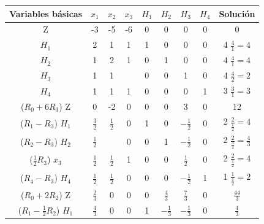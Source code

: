 \documentclass[fleqn, 12pt]{article}
\begin{document}
\begin{enumerate}
		\begin{center}
			\begin{tabular}{|c|c|c|c|c|c|c|c|c|}
				\hline
				Variables básicas & $ x_1 $ & $ x_2 $ & $ x_3 $  & $ H_1 $ & $ H_2 $ & $ H_3 $ & $ H_4 $ & Solución \\
				\hline
				Z                 & -3      & -5      & -6       & 0       & 0       & 0       & 0       & 0 \\
				\hline
				$ H_1 $           & 2       & 1       & 1        & 1       & 0       & 0       & 0       & 4 \; $ \frac{4}{1} = 4 $ \\
				\hline
				$ H_2 $           & 1       & 2       & 1        & 0       & 1       & 0       & 0       & 4 \; $ \frac{4}{1} = 4 $ \\
				\hline
				$ H_3 $           & 1       & 1       & \fbox{2} & 0       & 0       & 1       & 0       & 4 \; $ \frac{4}{2} = 2 $ \\
				\hline
				$ H_4 $           & 1       & 1       & 1        & 0       & 0       & 0       & 1       & 3 \; $ \frac{3}{1} = 3 $ \\
				\hline\hline
				($R_0 + 6 R_3$) Z & 0       & -2      & 0        & 0       & 0       & 3       & 0       & 12 \\
				\hline
				($R_1 - R_3$) $ H_1 $ & $ \frac{3}{2} $       &  $ \frac{1}{2} $       & 0        & 1       & 0       & $ -\frac{1}{2} $     & 0       & 2 \; $ \frac{2}{\frac{1}{2}} = 4 $ \\
				\hline
				($R_2 - R_3$) $ H_2 $ & $ \frac{1}{2} $       & \fbox{$ \frac{3}{2} $}       & 0        & 0       & 1       & $ -\frac{1}{2} $      & 0       & 2 \; $ \frac{2}{\frac{3}{2}} = \frac{4}{3} $ \\
				\hline
				($\frac{1}{2} R_3$) $ x_3 $           & $ \frac{1}{2} $       & $ \frac{1}{2} $       & 1		& 0       & 0       & $ \frac{1}{2} $ & 0       & 2 \; $ \frac{2}{\frac{1}{2}} = 4 $ \\
				\hline
				($R_4 - R_3$) $ H_4 $           & $ \frac{1}{2} $       & $ \frac{1}{2} $       & 0        & 0       & 0       & $ -\frac{1}{2} $ & 1       & 1 \; $ \frac{1}{\frac{1}{2}} = 2 $ \\
				\hline\hline
				($R_0 + 2 R_2$) Z & $ \frac{2}{3} $       & 0       & 0        & 0       & $ \frac{4}{3} $       & $ \frac{7}{3} $       & 0       & $ \frac{44}{3} $ \\
				\hline
				($R_1 - \frac{1}{2} R_2$) $ H_1 $ & $ \frac{4}{3} $       & 0       & 0        & 1       & $ -\frac{1}{3} $      & $ -\frac{1}{3} $     & 0       & $ \frac{4}{3} $ \\

\end{tabular}
\end{center}
\end{enumerate}
\end{document}
